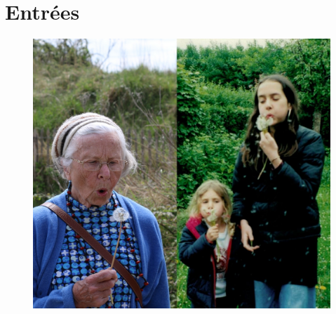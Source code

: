 \documentclass{C:/Users/Simon/Desktop/mamette/cuisine/recipe}
\begin{document}
\tableofcontents
\clearpage

\mainmatter%
\pagestyle{headings}

\chapter{Entrées}
\begin{figure}[h]
\centering
\includegraphics[width=\textwidth]{images/chapter1.jpg}
\end{figure}

\end{document}
